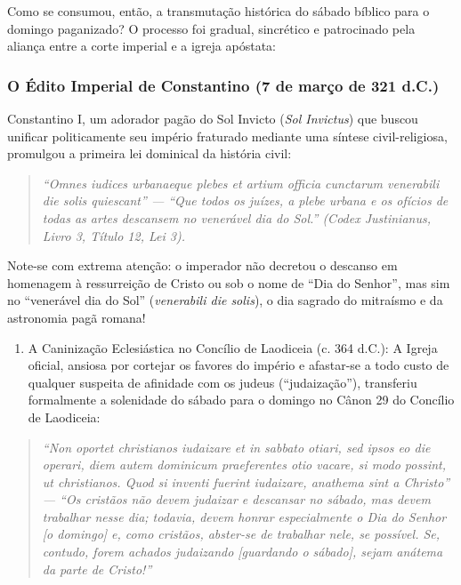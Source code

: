 \documentclass[11pt,a4paper,openany]{book}
\begin{document}
Como se consumou, então, a transmutação histórica do sábado bíblico para o domingo paganizado? O processo foi gradual, sincrético e patrocinado pela aliança entre a corte imperial e a igreja apóstata:


\subsubsection*{O Édito Imperial de Constantino (7 de março de 321 d.C.)}
Constantino I, um adorador pagão do Sol Invicto (\textit{Sol Invictus}) que buscou unificar politicamente seu império fraturado mediante uma síntese civil-religiosa, promulgou a primeira lei dominical da história civil:

\begin{quote}
\itshape \textit{``Omnes iudices urbanaeque plebes et artium officia cunctarum venerabili die solis quiescant''} — ``Que todos os juízes, a plebe urbana e os ofícios de todas as artes descansem no venerável dia do Sol.'' (\textit{Codex Justinianus}, Livro 3, Título 12, Lei 3).
\end{quote}

Note-se com extrema atenção: o imperador não decretou o descanso em homenagem à ressurreição de Cristo ou sob o nome de ``Dia do Senhor'', mas sim no ``venerável dia do Sol'' (\textit{venerabili die solis}), o dia sagrado do mitraísmo e da astronomia pagã romana!

\begin{enumerate}
  \item A Caninização Eclesiástica no Concílio de Laodiceia (c. 364 d.C.): A Igreja oficial, ansiosa por cortejar os favores do império e afastar-se a todo custo de qualquer suspeita de afinidade com os judeus (``judaização''), transferiu formalmente a solenidade do sábado para o domingo no Cânon 29 do Concílio de Laodiceia:
\end{enumerate}


\begin{quote}
\itshape \textit{``Non oportet christianos iudaizare et in sabbato otiari, sed ipsos eo die operari, diem autem dominicum praeferentes otio vacare, si modo possint, ut christianos. Quod si inventi fuerint iudaizare, anathema sint a Christo''} — ``Os cristãos não devem judaizar e descansar no sábado, mas devem trabalhar nesse dia; todavia, devem honrar especialmente o Dia do Senhor [o domingo] e, como cristãos, abster-se de trabalhar nele, se possível. Se, contudo, forem achados judaizando [guardando o sábado], sejam anátema da parte de Cristo!''
\end{quote}
\end{document}
